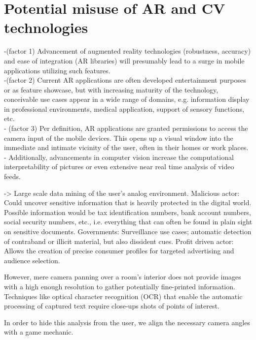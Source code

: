 
\section{Potential misuse of AR and CV technologies}

-(factor 1) Advancement of augmented reality technologies (robustness, accuracy) and ease of integration (AR libraries) will presumably lead to a surge in mobile applications utilizing such features. \\
-(factor 2) Current AR applications are often developed entertainment purposes or as feature showcase, but with increasing maturity of the technology, conceivable use cases appear in a wide range of domains, e.g. information display in professional environments, medical application, support of sensory functions, etc. \\
- (factor 3) Per definition, AR applications are granted permissions to access the camera input of the mobile devices. This opens up a visual window into the immediate and intimate vicinity of the user, often in their homes or work places. \\

- Additionally, advancements in computer vision increase the computational interpretability of pictures or even extensive near real time analysis of video feeds.

-> Large scale data mining of the user's analog environment.
Malicious actor: Could uncover sensitive information that is heavily protected in the digital world.
Possible information would be tax identification numbers, bank account numbers, social security numbers, etc., i.e. everything that can often be found in plain sight on sensitive documents.
Governments: Surveillance use cases; automatic detection of contraband or illicit material, but also dissident cues.
Profit driven actor: Allows the creation of precise consumer profiles for targeted advertising and audience selection.

However, mere camera panning over a room's interior does not provide images with a high enough resolution to gather potentially fine-printed information.
Techniques like optical character recognition (OCR) that enable the automatic processing of captured text require close-ups shots of points of interest.

In order to hide this analysis from the user, we align the necessary camera angles with a game mechanic.

